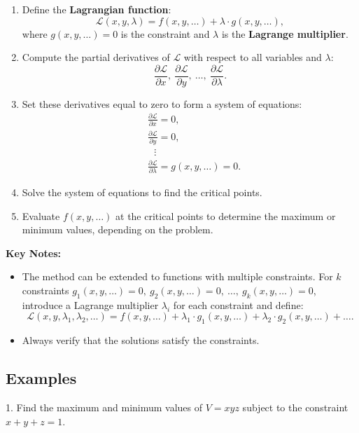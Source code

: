 \begin{enumerate}
    \item Define the \textbf{Lagrangian function}:
    \[
    \mathcal{L}(x, y, \lambda) = f(x, y, \dots) + \lambda \cdot g(x, y, \dots),
    \]
    where \( g(x, y, \dots) = 0 \) is the constraint and \( \lambda \) is the \textbf{Lagrange multiplier}.

    \item Compute the partial derivatives of \(\mathcal{L}\) with respect to all variables and \(\lambda\):
    \[
    \frac{\partial \mathcal{L}}{\partial x}, \ \frac{\partial \mathcal{L}}{\partial y}, \ \dots, \ \frac{\partial \mathcal{L}}{\partial \lambda}.
    \]

    \item Set these derivatives equal to zero to form a system of equations:
    \[
    \begin{aligned}
    &\frac{\partial \mathcal{L}}{\partial x} = 0, \\
    &\frac{\partial \mathcal{L}}{\partial y} = 0, \\
    &\,\,\,\,\vdots \\
    &\frac{\partial \mathcal{L}}{\partial \lambda} = g(x, y, \dots) = 0.
    \end{aligned}
    \]

    \item Solve the system of equations to find the critical points.

    \item Evaluate \( f(x, y, \dots) \) at the critical points to determine the maximum or minimum values, depending on the problem.
\end{enumerate}

\textbf{Key Notes:}
\begin{itemize}
    \item The method can be extended to functions with multiple constraints. For \(k\) constraints \( g_1(x, y, \dots) = 0, \ g_2(x, y, \dots) = 0, \ \dots, \ g_k(x, y, \dots) = 0\), introduce a Lagrange multiplier \(\lambda_i\) for each constraint and define:
    \[
    \mathcal{L}(x, y, \lambda_1, \lambda_2, \dots) = f(x, y, \dots) + \lambda_1 \cdot g_1(x, y, \dots) + \lambda_2 \cdot g_2(x, y, \dots) + \dots.
    \]
    \item Always verify that the solutions satisfy the constraints.
\end{itemize}

\subsection{Examples}
1. Find the maximum and minimum values of \(V = xyz\) subject to the constraint \(x + y + z = 1\).


